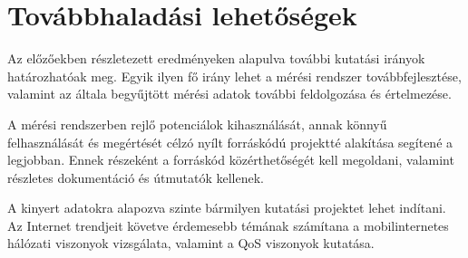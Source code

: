 \section{Továbbhaladási lehetőségek}

Az előzőekben részletezett eredményeken alapulva további kutatási irányok határozhatóak meg. Egyik ilyen fő irány lehet a mérési rendszer továbbfejlesztése, valamint az általa begyűjtött mérési adatok további feldolgozása és értelmezése.

A mérési rendszerben rejlő potenciálok kihasználását, annak könnyű felhasználását és megértését célzó nyílt forráskódú projektté alakítása segítené a legjobban. Ennek részeként a forráskód közérthetőségét kell megoldani, valamint részletes dokumentáció és útmutatók kellenek.

A kinyert adatokra alapozva szinte bármilyen kutatási projektet lehet indítani. Az Internet trendjeit követve érdemesebb témának számítana a mobilinternetes hálózati viszonyok vizsgálata, valamint a QoS viszonyok kutatása.



%

